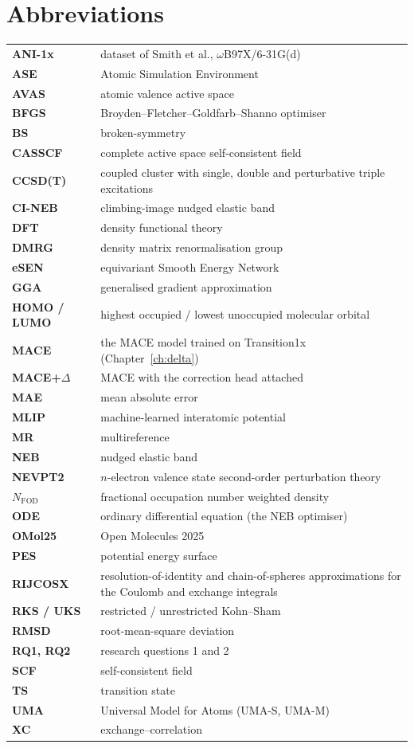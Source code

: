 \section*{Abbreviations}

\noindent
{\renewcommand{\arraystretch}{1.15}
\begin{tabular}{@{}p{2.8cm}p{\dimexpr\linewidth-2.8cm-2\tabcolsep\relax}@{}}
\toprule
  \textbf{ANI-1x} & \raggedright dataset of Smith et al., \mbox{$\omega$B97X/6-31G(d)} \tabularnewline
  \textbf{ASE} & \raggedright Atomic Simulation Environment \tabularnewline
  \textbf{AVAS} & \raggedright atomic valence active space \tabularnewline
  \textbf{BFGS} & \raggedright Broyden--Fletcher--Goldfarb--Shanno optimiser \tabularnewline
  \textbf{BS} & \raggedright broken-symmetry \tabularnewline
  \textbf{CASSCF} & \raggedright complete active space self-consistent field \tabularnewline
  \textbf{CCSD(T)} & \raggedright coupled cluster with single, double and perturbative triple excitations \tabularnewline
  \textbf{CI-NEB} & \raggedright climbing-image nudged elastic band \tabularnewline
  \textbf{DFT} & \raggedright density functional theory \tabularnewline
  \textbf{DMRG} & \raggedright density matrix renormalisation group \tabularnewline
  \textbf{eSEN} & \raggedright equivariant Smooth Energy Network \tabularnewline
  \textbf{GGA} & \raggedright generalised gradient approximation \tabularnewline
  \textbf{HOMO / LUMO} & \raggedright highest occupied / lowest unoccupied molecular orbital \tabularnewline
  \textbf{MACE} & \raggedright the MACE model trained on Transition1x (Chapter~\ref{ch:delta}) \tabularnewline
  \textbf{MACE+$\Delta$} & \raggedright MACE with the correction head attached \tabularnewline
  \textbf{MAE} & \raggedright mean absolute error \tabularnewline
  \textbf{MLIP} & \raggedright machine-learned interatomic potential \tabularnewline
  \textbf{MR} & \raggedright multireference \tabularnewline
  \textbf{NEB} & \raggedright nudged elastic band \tabularnewline
  \textbf{NEVPT2} & \raggedright $n$-electron valence state second-order perturbation theory \tabularnewline
  \textbf{$N_\mathrm{FOD}$} & \raggedright fractional occupation number weighted density \tabularnewline
  \textbf{ODE} & \raggedright ordinary differential equation (the NEB optimiser) \tabularnewline
  \textbf{OMol25} & \raggedright Open Molecules 2025 \tabularnewline
  \textbf{PES} & \raggedright potential energy surface \tabularnewline
  \textbf{RIJCOSX} & \raggedright resolution-of-identity and chain-of-spheres approximations for the Coulomb and exchange integrals \tabularnewline
  \textbf{RKS / UKS} & \raggedright restricted / unrestricted Kohn--Sham \tabularnewline
  \textbf{RMSD} & \raggedright root-mean-square deviation \tabularnewline
  \textbf{RQ1, RQ2} & \raggedright research questions 1 and 2 \tabularnewline
  \textbf{SCF} & \raggedright self-consistent field \tabularnewline
  \textbf{TS} & \raggedright transition state \tabularnewline
  \textbf{UMA} & \raggedright Universal Model for Atoms (UMA-S, UMA-M) \tabularnewline
  \textbf{XC} & \raggedright exchange--correlation \tabularnewline
\bottomrule
\end{tabular}}

